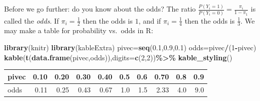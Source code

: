 \documentclass[
  ignorenonframetext,
]{beamer}
\newenvironment{Shaded}{\begin{snugshade}}{\end{snugshade}}
\newcommand{\AttributeTok}[1]{\textcolor[rgb]{0.13,0.29,0.53}{#1}}
\newcommand{\DecValTok}[1]{\textcolor[rgb]{0.00,0.00,0.81}{#1}}
\newcommand{\FloatTok}[1]{\textcolor[rgb]{0.00,0.00,0.81}{#1}}
\newcommand{\FunctionTok}[1]{\textcolor[rgb]{0.13,0.29,0.53}{\textbf{#1}}}
\newcommand{\NormalTok}[1]{#1}
\newcommand{\OtherTok}[1]{\textcolor[rgb]{0.56,0.35,0.01}{#1}}
\newcommand{\SpecialCharTok}[1]{\textcolor[rgb]{0.81,0.36,0.00}{\textbf{#1}}}
\begin{document}
\begin{frame}[fragile]
Before we go further: do you know about the odds? The ratio
\(\frac{P(Y_i=1)}{P(Y_i=0)}=\frac{\pi_i}{1-\pi_1}\) is called the
\emph{odds}. If \(\pi_i=\frac{1}{2}\) then the odds is \(1\), and if
\(\pi_i=\frac{1}{4}\) then the odds is \(\frac{1}{3}\). We may make a
table for probability vs.~odds in R:

\begin{Shaded}
\begin{Highlighting}[]
\FunctionTok{library}\NormalTok{(knitr)}
\FunctionTok{library}\NormalTok{(kableExtra)}
\NormalTok{pivec}\OtherTok{=}\FunctionTok{seq}\NormalTok{(}\FloatTok{0.1}\NormalTok{,}\FloatTok{0.9}\NormalTok{,}\FloatTok{0.1}\NormalTok{)}
\NormalTok{odds}\OtherTok{=}\NormalTok{pivec}\SpecialCharTok{/}\NormalTok{(}\DecValTok{1}\SpecialCharTok{{-}}\NormalTok{pivec)}
\FunctionTok{kable}\NormalTok{(}\FunctionTok{t}\NormalTok{(}\FunctionTok{data.frame}\NormalTok{(pivec,odds)),}\AttributeTok{digits=}\FunctionTok{c}\NormalTok{(}\DecValTok{2}\NormalTok{,}\DecValTok{2}\NormalTok{))}\SpecialCharTok{\%\textgreater{}\%}
  \FunctionTok{kable\_styling}\NormalTok{()}
\end{Highlighting}
\end{Shaded}

\begin{table}
\centering
\begin{tabular}{l|r|r|r|r|r|r|r|r|r}
\hline
pivec & 0.10 & 0.20 & 0.30 & 0.40 & 0.5 & 0.6 & 0.70 & 0.8 & 0.9\\
\hline
odds & 0.11 & 0.25 & 0.43 & 0.67 & 1.0 & 1.5 & 2.33 & 4.0 & 9.0\\
\hline
\end{tabular}
\end{table}
\end{frame}
\end{document}
